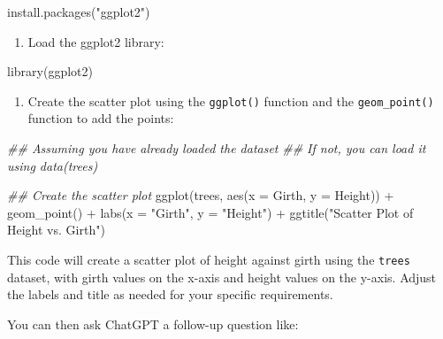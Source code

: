 \documentclass[
  letterpaper,
  DIV=11,
  numbers=noendperiod]{scrreprt}
\newenvironment{Shaded}{\begin{snugshade}}{\end{snugshade}}
\newcommand{\AttributeTok}[1]{\textcolor[rgb]{0.40,0.45,0.13}{#1}}
\newcommand{\DocumentationTok}[1]{\textcolor[rgb]{0.37,0.37,0.37}{\textit{#1}}}
\newcommand{\FunctionTok}[1]{\textcolor[rgb]{0.28,0.35,0.67}{#1}}
\newcommand{\NormalTok}[1]{\textcolor[rgb]{0.00,0.23,0.31}{#1}}
\newcommand{\SpecialCharTok}[1]{\textcolor[rgb]{0.37,0.37,0.37}{#1}}
\newcommand{\StringTok}[1]{\textcolor[rgb]{0.13,0.47,0.30}{#1}}
\providecommand{\tightlist}{%
  \setlength{\itemsep}{0pt}\setlength{\parskip}{0pt}}\usepackage{longtable,booktabs,array}
\begin{document}
\begin{Shaded}
\begin{Highlighting}[]
\FunctionTok{install.packages}\NormalTok{(}\StringTok{"ggplot2"}\NormalTok{)}
\end{Highlighting}
\end{Shaded}

\begin{enumerate}
\def\labelenumi{\arabic{enumi}.}
\setcounter{enumi}{1}
\tightlist
\item
  Load the ggplot2 library:
\end{enumerate}

\begin{Shaded}
\begin{Highlighting}[]
\FunctionTok{library}\NormalTok{(ggplot2)}
\end{Highlighting}
\end{Shaded}

\begin{enumerate}
\def\labelenumi{\arabic{enumi}.}
\setcounter{enumi}{2}
\tightlist
\item
  Create the scatter plot using the \texttt{ggplot()} function and the
  \texttt{geom\_point()} function to add the points:
\end{enumerate}

\begin{Shaded}
\begin{Highlighting}[]
\DocumentationTok{\#\# Assuming you have already loaded the dataset}
\DocumentationTok{\#\# If not, you can load it using data(trees)}

\DocumentationTok{\#\# Create the scatter plot}
\FunctionTok{ggplot}\NormalTok{(trees, }\FunctionTok{aes}\NormalTok{(}\AttributeTok{x =}\NormalTok{ Girth, }\AttributeTok{y =}\NormalTok{ Height)) }\SpecialCharTok{+}
  \FunctionTok{geom\_point}\NormalTok{() }\SpecialCharTok{+}
  \FunctionTok{labs}\NormalTok{(}\AttributeTok{x =} \StringTok{"Girth"}\NormalTok{, }\AttributeTok{y =} \StringTok{"Height"}\NormalTok{) }\SpecialCharTok{+}
  \FunctionTok{ggtitle}\NormalTok{(}\StringTok{"Scatter Plot of Height vs. Girth"}\NormalTok{)}
\end{Highlighting}
\end{Shaded}

This code will create a scatter plot of height against girth using the
\texttt{trees} dataset, with girth values on the x-axis and height
values on the y-axis. Adjust the labels and title as needed for your
specific requirements.

You can then ask ChatGPT a follow-up question like:
\end{document}
